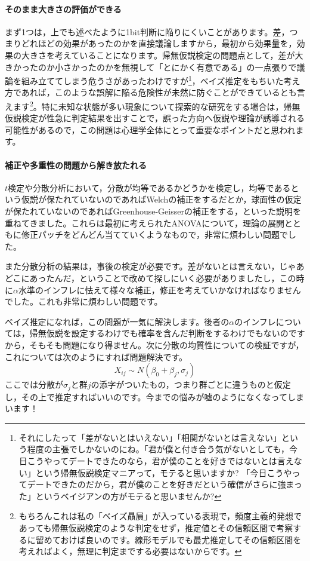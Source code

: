 \documentclass{ltjsarticle}
\begin{document}
\paragraph{そのまま大きさの評価ができる}
まず1つは，上でも述べたように1bit判断に陥りにくいことがあります。差，つまりどれほどの効果があったのかを直接議論しますから，最初から効果量を，効果の大きさを考えていることになります。帰無仮説検定の問題点として，差が大きかったのか小さかったのかを無視して「とにかく有意である」の一点張りで議論を組み立ててしまう危うさがあったわけですが\footnote{それにしたって「差がないとはいえない」「相関がないとは言えない」という程度の主張でしかないのにね。「君が僕と付き合う気がないとしても，今日こうやってデートできたのなら，君が僕のことを好きではないとは言えない」という帰無仮説検定マニアって，モテると思いますか? 「今日こうやってデートできたのだから，君が僕のことを好きだという確信がさらに強まった」というベイジアンの方がモテると思いませんか? }，ベイズ推定をもちいた考え方であれば，このような誤解に陥る危険性が未然に防ぐことができているとも言えます\footnote{もちろんこれは私の「ベイズ贔屓」が入っている表現で，頻度主義的発想であっても帰無仮説検定のような判定をせず，推定値とその信頼区間で考察するに留めておけば良いのです。線形モデルでも最尤推定してその信頼区間を考えればよく，無理に判定までする必要はないからです。}。特に未知な状態が多い現象について探索的な研究をする場合は，帰無仮説検定が性急に判定結果を出すことで，誤った方向へ仮説や理論が誘導される可能性があるので，この問題は心理学全体にとって重要なポイントだと思われます。
\paragraph{補正や多重性の問題から解き放たれる}
$t$検定や分散分析において，分散が均等であるかどうかを検定し，均等であるという仮説が保たれていないのであればWelchの補正をするだとか，球面性の仮定が保たれていないのであればGreenhouse-Geisserの補正をする，といった説明を重ねてきました。これらは最初に考えられたANOVAについて，理論の展開とともに修正パッチをどんどん当てていくようなもので，非常に煩わしい問題でした。

また分散分析の結果は，事後の検定が必要です。差がないとは言えない，じゃあどこにあったんだ，ということで改めて探しにいく必要がありましたし，この時に$\alpha$水準のインフレに怯えて様々な補正，修正を考えていかなければなりませんでした。これも非常に煩わしい問題です。

ベイズ推定になれば，この問題が一気に解決します。後者の$\alpha$のインフレについては，帰無仮説を設定するわけでも確率を含んだ判断をするわけでもないのですから，そもそも問題になり得ません。次に分散の均質性についての検証ですが，これについては次のようにすれば問題解決です。
\[ X_{ij} \sim N(\beta_0 + \beta_j, \sigma_j)\]
ここでは分散が$\sigma_j$と群$j$の添字がついたもの，つまり群ごとに違うものと仮定し，その上で推定すればいいのです。今までの悩みが嘘のようになくなってしまいます！
\end{document}
